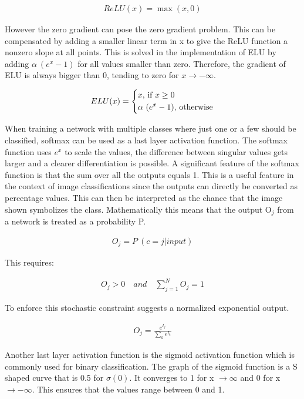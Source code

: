 \documentclass[
a4paper, 
12pt,
grayscalebody, %
abstract=on,
twoside, BCOR10mm, 12pt, DIV13,headinclude, footexclude, final, abstracton, openright
]{ibireprt}
\numberwithin{equation}{chapter}
\numberwithin{table}{chapter}
\numberwithin{figure}{chapter}
\numberwithin{algorithm}{chapter}
\numberwithin{example}{chapter}
\numberwithin{example}{chapter}
\begin{document}
\begin{align}
	ReLU(x) = \max(x,0)
\end{align}

However the zero gradient can pose the zero gradient problem. %
This can be compensated by adding a smaller linear term in x to give the ReLU function a nonzero slope at all points. This is solved in the implementation of ELU by adding $\alpha \ (e^x-1)$ for all values smaller than zero. Therefore, the gradient of ELU is always bigger than 0, tending to zero for $x \rightarrow - \infty$.


\begin{align}
	ELU(x) = 
	\begin{dcases}
		x \text{, if } x \geq 0 \\
		\alpha \ (e^x-1) \text{, otherwise}
	\end{dcases}
\end{align}

When training a network with multiple classes where just one or a few should be classified, softmax can be used as a last layer activation function. The softmax function uses $e^x$ to scale the values, the difference between singular values gets larger and a clearer differentiation is possible. A significant feature of the softmax function is that the sum over all the outputs equals 1. This is a useful feature in the context of image classifications since the outputs can directly be converted as percentage values. This can then be interpreted as the chance that the image shown symbolizes the class. Mathematically this means that the output O$_j$ from a network is treated as a probability P.

\begin{align}
	O_j = P \ (c= j | input)
\end{align}

This requires: 

\begin{align}
	O_j > 0 
	\quad and \quad
	\sum_{j=1}^{N} O_j = 1 
\end{align}

To enforce this stochastic constraint \cite{Bridle1990} suggests a normalized exponential output. 

\begin{align}
	O_j = \frac{e^{I_j}}{\sum_{k}^{} e^{I_k}} 	
\end{align}

Another last layer activation function is the sigmoid activation function which is commonly used for binary classification.
 The graph of the sigmoid function is a S shaped curve that is 0.5 for $\sigma(0)$. It converges to 1 for x $\rightarrow \infty$ and 0 for x $\rightarrow -\infty$. This ensures that the values range between 0 and 1. 
 
\end{document}
